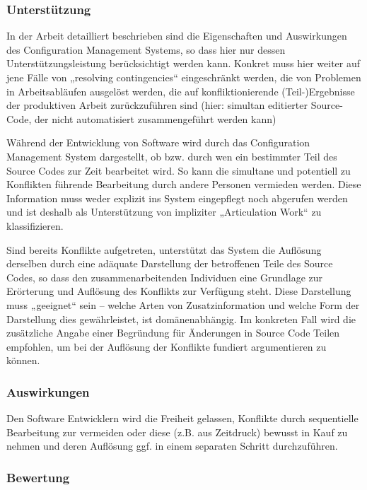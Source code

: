 \subsubsection{Unterstützung}

In der Arbeit detailliert beschrieben sind die Eigenschaften und Auswirkungen des Configuration Management Systems, so dass hier nur dessen Unterstützungsleistung berücksichtigt werden kann. Konkret muss hier weiter auf jene Fälle von „resolving contingencies“ eingeschränkt werden, die von Problemen in Arbeitsabläufen ausgelöst werden, die auf konfliktionierende (Teil-)Ergebnisse der produktiven Arbeit zurückzuführen sind (hier: simultan editierter Source-Code, der nicht automatisiert zusammengeführt werden kann)

Während der Entwicklung von Software wird durch das Configuration Management System dargestellt, ob bzw. durch wen ein bestimmter Teil des Source Codes zur Zeit bearbeitet wird. So kann die simultane und potentiell zu Konflikten führende Bearbeitung durch andere Personen vermieden werden. Diese Information muss weder explizit ins System eingepflegt noch abgerufen werden und ist deshalb als Unterstützung von impliziter „Articulation Work“ zu klassifizieren.

Sind bereits Konflikte aufgetreten, unterstützt das System die Auflösung derselben durch eine adäquate Darstellung der betroffenen Teile des Source Codes, so dass den zusammenarbeitenden Individuen eine Grundlage zur Erörterung und Auflösung des Konflikts zur Verfügung steht. Diese Darstellung muss „geeignet“ sein -- welche Arten von Zusatzinformation und welche Form der Darstellung dies gewährleistet, ist domänenabhängig. Im konkreten Fall wird die zusätzliche Angabe einer Begründung für Änderungen in Source Code Teilen empfohlen, um bei der Auflösung der Konflikte fundiert argumentieren zu können.

\subsubsection{Auswirkungen}

Den Software Entwicklern wird die Freiheit gelassen, Konflikte durch sequentielle Bearbeitung zur vermeiden oder diese (z.B. aus Zeitdruck) bewusst in Kauf zu nehmen und deren Auflösung ggf. in einem separaten Schritt durchzuführen.

\subsubsection{Bewertung}

